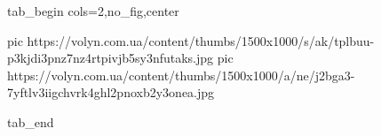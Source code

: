  
 
 
 
 


\ifcmt
  tab_begin cols=2,no_fig,center

     pic https://volyn.com.ua/content/thumbs/1500x1000/s/ak/tplbuu-p3kjdi3pnz7nz4rtpivjb5sy3nfutaks.jpg
		 pic https://volyn.com.ua/content/thumbs/1500x1000/a/ne/j2bga3-7yftlv3iigchvrk4ghl2pnoxb2y3onea.jpg

  tab_end
\fi
